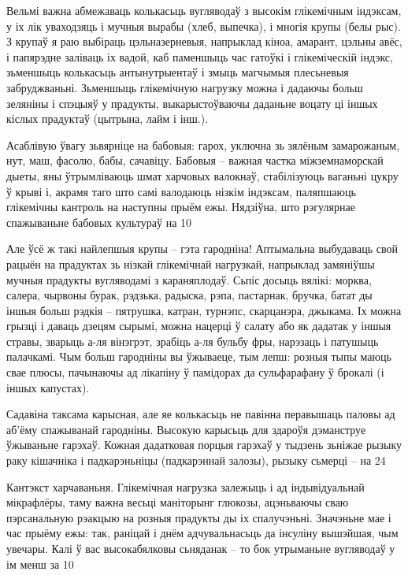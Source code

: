 Вельмі важна абмежаваць колькасьць вугляводаў з высокім глікемічным індэксам, у іх лік уваходзяць і мучныя вырабы (хлеб, выпечка), і многія крупы (белы рыс). З крупаў я раю выбіраць цэльназерневыя, напрыклад кіноа, амарант, цэльны авёс, і папярэдне заліваць іх вадой, каб паменшыць час гатоўкі і глікеміческій індэкс, зьменшыць колькасьць антынутрыентаў і змыць магчымыя плесьневыя забруджваньні. Зьменшыць глікемічную нагрузку можна і дадаючы больш зеляніны і спэцыяў у прадукты, выкарыстоўваючы даданьне воцату ці іншых кіслых прадуктаў (цытрына, лайм і інш.).

Асаблівую ўвагу зьвярніце на бабовыя: гарох, уключна зь зялёным замарожаным, нут, маш, фасолю, бабы, сачавіцу. Бабовыя – важная частка міжземнаморскай дыеты, яны ўтрымліваюць шмат харчовых валокнаў, стабілізуюць ваганьні цукру ў крыві і, акрамя таго што самі валодаюць нізкім індэксам, паляпшаюць глікемічны кантроль на наступны прыём ежы. Нядзіўна, што рэгулярнае спажываньне бабовых культураў на 10%

Але ўсё ж такі найлепшыя крупы – гэта гародніна! Аптымальна выбудаваць свой рацыён на прадуктах зь нізкай глікемічнай нагрузкай, напрыклад замяніўшы мучныя прадукты вугляводамі з караняплодаў. Сьпіс досыць вялікі: морква, салера, чырвоны бурак, рэдзька, радыска, рэпа, пастарнак, бручка, батат ды іншыя больш рэдкія – пятрушка, катран, турнэпс, скарцанэра, джыкама. Іх можна грызці і даваць дзецям сырымі, можна нацерці ў салату або як дадатак у іншыя стравы, зварыць а-ля вінэгрэт, зрабіць а-ля бульбу фры, нарэзаць і патушыць палачкамі. Чым больш гародніны вы ўжываеце, тым лепш: розныя тыпы маюць свае плюсы, пачынаючы ад лікапіну ў памідорах да сульфарафану ў брокалі (і іншых капустах).

Садавіна таксама карысная, але яе колькасьць не павінна перавышаць паловы ад аб'ёму спажыванай гародніны. Высокую карысьць для здароўя дэманструе ўжываньне гарэхаў. Кожная дадатковая порцыя гарэхаў у тыдзень зьніжае рызыку раку кішачніка і падкарэньніцы (падкарэннай залозы), рызыку сьмерці – на 24%

Кантэкст харчаваньня. Глікемічная нагрузка залежыць і ад індывідуальнай мікрафлёры, таму важна весьці маніторынг глюкозы, ацэньваючы сваю пэрсанальную рэакцыю на розныя прадукты ды іх спалучэньні. Значэньне мае і час прыёму ежы: так, раніцай і днём адчувальнасьць да інсуліну вышэйшая, чым увечары. Калі ў вас высокабялковы сьняданак – то бок утрыманьне вугляводаў у ім менш за 10%

